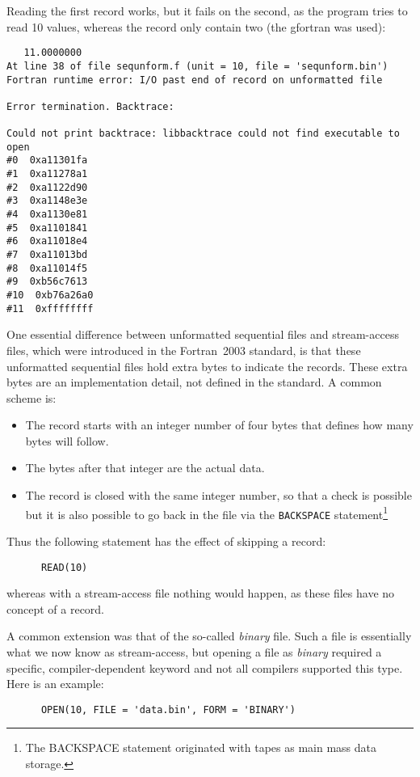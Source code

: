 Reading the first record works, but it fails on the second, as the program
tries to read 10 values, whereas the record only contain two (the gfortran was used):

\begin{verbatim}
   11.0000000
At line 38 of file sequnform.f (unit = 10, file = 'sequnform.bin')
Fortran runtime error: I/O past end of record on unformatted file

Error termination. Backtrace:

Could not print backtrace: libbacktrace could not find executable to open
#0  0xa11301fa
#1  0xa11278a1
#2  0xa1122d90
#3  0xa1148e3e
#4  0xa1130e81
#5  0xa1101841
#6  0xa11018e4
#7  0xa11013bd
#8  0xa11014f5
#9  0xb56c7613
#10  0xb76a26a0
#11  0xffffffff
\end{verbatim}

One essential difference between unformatted sequential files and stream-access files,
which were introduced in the Fortran~2003 standard, is that these unformatted sequential files
hold extra bytes to indicate the records. These extra bytes are an implementation detail,
not defined in the standard. A common scheme is:
\begin{itemize}
\item
The record starts with an integer number of four bytes that defines how many bytes
will follow.
\item
The bytes after that integer are the actual data.
\item
The record is closed with the same integer number, so that a check is possible but it
is also possible to go back in the file via the \verb+BACKSPACE+ statement\footnote{The
BACKSPACE statement originated with tapes as main mass data storage.}
\end{itemize}

Thus the following statement has the effect of skipping a record:
%
\begin{verbatim}
      READ(10)
\end{verbatim}
%
\noindent whereas with a stream-access file nothing would happen, as these files have no
concept of a record.

A common extension was that of the so-called \emph{binary} file. Such a file is essentially
what we now know as stream-access, but opening a file as \emph{binary} required a specific,
compiler-dependent keyword and not all compilers supported this type. Here is an example:
%
\begin{verbatim}
      OPEN(10, FILE = 'data.bin', FORM = 'BINARY')
\end{verbatim}


